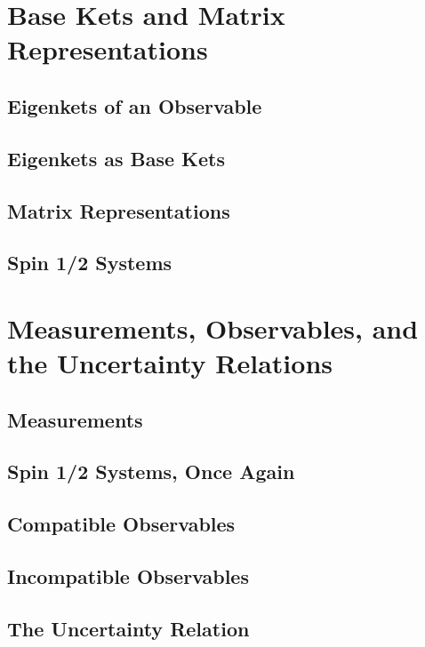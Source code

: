 \documentclass[11pt]{elegantbook}
\begin{document}
\newpage

\section{Base Kets and Matrix Representations}

\subsection{Eigenkets of an Observable}



\subsection{Eigenkets as Base Kets}

\subsection{Matrix Representations}

\subsection{Spin 1/2 Systems}

\newpage

\section{Measurements, Observables, and the Uncertainty Relations}

\subsection{Measurements}

\subsection{Spin 1/2 Systems, Once Again}

\subsection{Compatible Observables}

\subsection{Incompatible Observables}

\subsection{The Uncertainty Relation}
\end{document}
